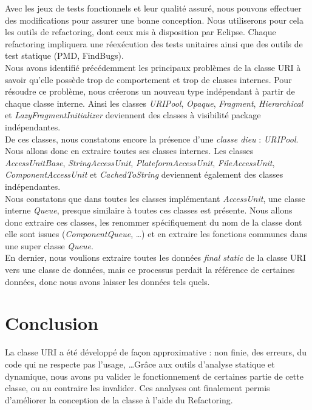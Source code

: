 \documentclass[a4paper,11pt]{article}
\newcommand{\br}{\\\mbox{}}
\begin{document}
Avec les jeux de tests fonctionnels et leur qualité assuré, nous pouvons effectuer des modifications pour assurer une bonne conception. Nous utiliserons pour cela les outils de refactoring, dont ceux mis à disposition par Eclipse. Chaque refactoring impliquera une réexécution des tests unitaires ainsi que des outils de test statique (PMD, FindBugs).\br
Nous avons identifié précédemment les principaux problèmes de la classe URI à savoir qu'elle possède trop de comportement et trop de classes internes. Pour résoudre ce problème, nous créerons un nouveau type indépendant à partir de chaque classe interne. Ainsi les classes \textit{URIPool}, \textit{Opaque}, \textit{Fragment}, \textit{Hierarchical} et \textit{LazyFragmentInitializer} deviennent des classes à visibilité package indépendantes.\br
De ces classes, nous constatons encore la présence d'une \textit{classe dieu} : \textit{URIPool}. Nous allons donc en extraire toutes ses classes internes. Les classes \textit{AccessUnitBase}, \textit{StringAccessUnit}, \textit{PlateformAccessUnit}, \textit{FileAccessUnit}, \textit{ComponentAccessUnit} et \textit{CachedToString} deviennent également des classes indépendantes.\br
Nous constatons que dans toutes les classes implémentant \textit{AccessUnit}, une classe interne \textit{Queue}, presque similaire à toutes ces classes est présente. Nous allons donc extraire ces classes, les renommer spécifiquement du nom de la classe dont elle sont issues (\textit{ComponentQueue}, \dots) et en extraire les fonctions communes dans une super classe \textit{Queue}.\br
En dernier, nous voulions extraire toutes les données \textit{ final static} de la classe URI vers une classe de données, mais ce processus perdait la référence de certaines données, donc nous avons laisser les données tels quels.

\section{Conclusion}

La classe URI a été développé de façon approximative : non finie, des erreurs, du code qui ne respecte pas l'usage, \dots Grâce aux outils d'analyse statique et dynamique, nous avons pu valider le fonctionnement de certaines partie de cette classe, ou au contraire les invalider. Ces analyses ont finalement permis d'améliorer la conception de la classe à l'aide du Refactoring.
\end{document}
